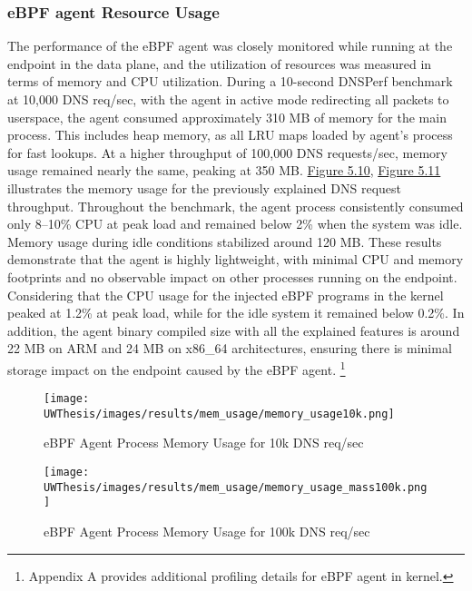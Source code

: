 \documentclass [11pt, proquest] {uwthesis}[2020/02/24]
\begin{document}
\subsubsection{eBPF agent Resource Usage}
The performance of the eBPF agent was closely monitored while running at the endpoint in the data plane, and the utilization of resources was measured in terms of memory and CPU utilization. During a 10-second DNSPerf benchmark at 10,000 DNS req/sec, with the agent in active mode redirecting all packets to userspace, the agent consumed approximately 310 MB of memory for the main process. This includes heap memory, as all LRU maps loaded by agent's process for fast lookups. At a higher throughput of 100,000 DNS requests/sec, memory usage remained nearly the same, peaking at 350 MB. \hyperref[fig:mem10k]{Figure 5.10},  \hyperref[fig:mem100k]{Figure 5.11} illustrates the memory usage for the previously explained DNS request throughput. Throughout the benchmark, the agent process consistently consumed only 8–10\% CPU at peak load and remained below 2\% when the system was idle. Memory usage during idle conditions stabilized around 120 MB. These results demonstrate that the agent is highly lightweight, with minimal CPU and memory footprints and no observable impact on other processes running on the endpoint. Considering that the CPU usage for the injected eBPF programs in the kernel peaked at 1.2\% at peak load, while for the idle system it remained below 0.2\%. In addition, the agent binary compiled size with all the explained features is around 22 MB on ARM and 24 MB on x86\_64 architectures, ensuring there is minimal storage impact on the endpoint caused by the eBPF agent. \footnote{Appendix A provides additional profiling details for eBPF agent in kernel.}

\begin{figure}[H]
  \centering
  \begin{minipage}[b]{0.48\textwidth}
    \centering
    \texttt{[image: UWThesis/images/results/mem\_usage/memory\_usage10k.png]}
    \caption{eBPF Agent Process Memory Usage for 10k DNS req/sec}
    \label{fig:mem10k}
  \end{minipage}
  \hfill
  \begin{minipage}[b]{0.48\textwidth}
    \centering
    \texttt{[image: UWThesis/images/results/mem\_usage/memory\_usage\_mass100k.png]}
    \caption{eBPF Agent Process Memory Usage for 100k DNS req/sec}
    \label{fig:mem100k}
  \end{minipage}
\end{figure}
\end{document}
